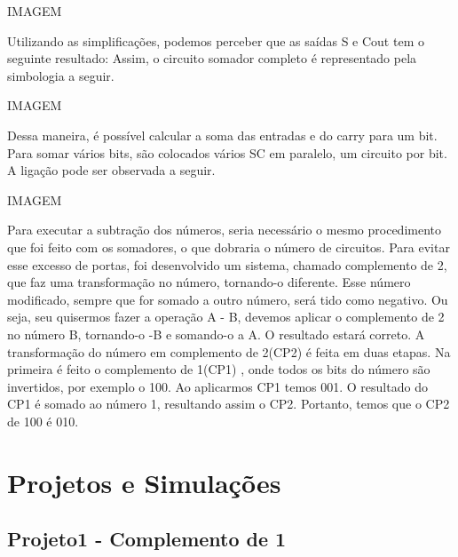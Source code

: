 \documentclass[12pts]{article}
\begin{document}
IMAGEM


Utilizando as simplificações, podemos perceber que as saídas S e Cout tem o seguinte resultado:
Assim, o circuito somador completo é representado pela simbologia a seguir.

IMAGEM

Dessa maneira, é possível calcular a soma das entradas e do carry para um bit.
Para somar vários bits, são colocados vários SC em paralelo, um circuito por bit. A ligação pode ser observada a seguir.

IMAGEM

Para executar a subtração dos números, seria necessário o mesmo procedimento que foi feito com os somadores, o que dobraria o número de circuitos. Para evitar esse excesso de portas, foi desenvolvido um sistema, chamado complemento de 2, que faz uma transformação no número, tornando-o diferente. Esse número modificado, sempre que for somado a outro número, será tido como negativo. Ou seja, seu quisermos fazer a operação A - B, devemos aplicar o complemento de 2 no número B, tornando-o -B e somando-o a A. O resultado estará correto.
A transformação do número em complemento de 2(CP2) é feita em duas etapas. Na primeira é feito o complemento de 1(CP1) , onde todos os bits do número são invertidos, por exemplo o 100. Ao aplicarmos CP1 temos 001. O resultado do CP1 é somado ao número 1, resultando assim o CP2. Portanto, temos que o CP2 de 100 é 010.

\newpage

\section{Projetos e Simulações}
\subsection{Projeto1 - Complemento de 1}

\end{document}
